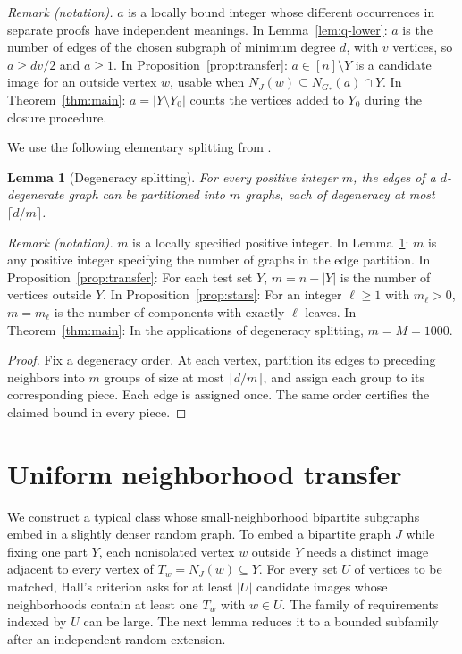 \documentclass[11pt]{article}
\newtheorem{lemma}[theorem]{Lemma}
\theoremstyle{remark}
\numberwithin{equation}{section}
\begin{document}
\noindent\textit{Remark (notation).} $a$ is a locally bound integer whose different occurrences in separate proofs have independent meanings. In Lemma~\ref{lem:q-lower}: $a$ is the number of edges of the chosen subgraph of minimum degree $d$, with $v$ vertices, so $a\geq dv/2$ and $a\geq1$. In Proposition~\ref{prop:transfer}: $a\in[n]\setminus Y$ is a candidate image for an outside vertex $w$, usable when $N_J(w)\subseteq N_{G_*}(a)\cap Y$. In Theorem~\ref{thm:main}: $a=|Y\setminus Y_0|$ counts the vertices added to $Y_0$ during the closure procedure.


We use the following elementary splitting from
\cite[Claim~3.9]{AHPT26}.

\begin{lemma}[Degeneracy splitting]\label{lem:split}
For every positive integer $m$, the edges of a $d$-degenerate
graph can be partitioned into $m$ graphs, each of degeneracy
at most $\lceil d/m\rceil$.
\end{lemma}

\noindent\textit{Remark (notation).} $m$ is a locally specified positive integer. In Lemma~\ref{lem:split}: $m$ is any positive integer specifying the number of graphs in the edge partition. In Proposition~\ref{prop:transfer}: For each test set $Y$, $m=n-|Y|$ is the number of vertices outside $Y$. In Proposition~\ref{prop:stars}: For an integer $\ell\geq1$ with $m_\ell>0$, $m=m_\ell$ is the number of components with exactly $\ell$ leaves. In Theorem~\ref{thm:main}: In the applications of degeneracy splitting, $m=M=1000$.

\begin{proof}
Fix a degeneracy order. At each vertex, partition its edges to
preceding neighbors into $m$ groups of size at most
$\lceil d/m\rceil$, and assign each group to its corresponding
piece. Each edge is assigned once. The same order certifies the
claimed bound in every piece.
\end{proof}

\section{Uniform neighborhood transfer}
\label{sec:transfer}

We construct a typical class whose small-neighborhood bipartite
subgraphs embed in a slightly denser random graph. To embed a
bipartite graph $J$ while fixing one part $Y$, each nonisolated
vertex $w$ outside $Y$ needs a distinct image adjacent to every
vertex of $T_w=N_J(w)\subseteq Y$. For every set $U$ of vertices
to be matched, Hall's criterion asks for at least $|U|$ candidate
images whose neighborhoods contain at least one $T_w$ with $w\in U$.
The family of requirements indexed by $U$ can be large. The next
lemma reduces it to a bounded subfamily after an independent
random extension.
\end{document}
